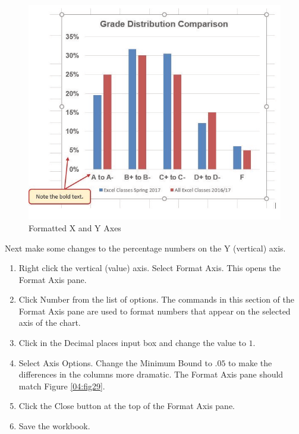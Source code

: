 \begin{figure}[H]
	\centering
	\includegraphics[width=\maxwidth{.95\linewidth}]{gfx/ch04_fig28}
	\caption{Formatted X and Y Axes}
	\label{04:fig28}
\end{figure}

Next make some changes to the percentage numbers on the Y (vertical) axis.

\begin{enumerate}
	\item Right click the vertical (value) axis. Select Format Axis. This opens the Format Axis pane.
	\item Click Number from the list of options. The commands in this section of the Format Axis pane are used to format numbers that appear on the selected axis of the chart.
	\item Click in the Decimal places input box and change the value to $ 1 $.
	\item Select Axis Options. Change the Minimum Bound to $ .05 $ to make the differences in the columns more dramatic. The Format Axis pane should match Figure \ref{04:fig29}.
	\item Click the Close button at the top of the Format Axis pane.
	\item Save the workbook.
\end{enumerate}

